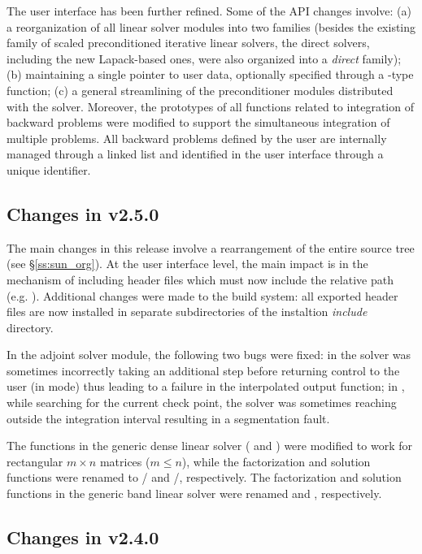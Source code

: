 The user interface has been further refined. Some of the API changes involve:
(a) a reorganization of all linear solver modules into two families (besides 
the existing family of scaled preconditioned iterative linear solvers,
the direct solvers, including the new Lapack-based ones, were also organized 
into a {\em direct} family); (b) maintaining a single pointer to user data,
optionally specified through a -type function; (c) a general 
streamlining of the preconditioner modules distributed with the solver.
Moreover, the prototypes of all functions related to integration of backward 
problems were modified to support the simultaneous integration of multiple 
problems. All backward problems defined by the user are internally managed
through a linked list and identified in the user interface through a
unique identifier.


\subsection*{Changes in v2.5.0}

The main changes in this release involve a rearrangement of the entire 
{\sundials} source tree (see \S\ref{ss:sun_org}). At the user interface 
level, the main impact is in the mechanism of including {\sundials} header
files which must now include the relative path (e.g. ).
Additional changes were made to the build system: all exported header files are
now installed in separate subdirectories of the instaltion {\em include} directory.

In the adjoint solver module, the following two bugs were fixed: in 
the solver was sometimes incorrectly taking an additional step before
returning control to the user (in  mode) thus leading to 
a failure in the interpolated output function; in , while searching
for the current check point, the solver was sometimes reaching outside the
integration interval resulting in a segmentation fault.

The functions in the generic dense linear solver ( and
) were modified to work for rectangular $m \times n$
matrices ($m \le n$), while the factorization and solution functions were
renamed to / and /, 
respectively.
The factorization and solution functions in the generic band linear solver were 
renamed  and , respectively.

\subsection*{Changes in v2.4.0}

